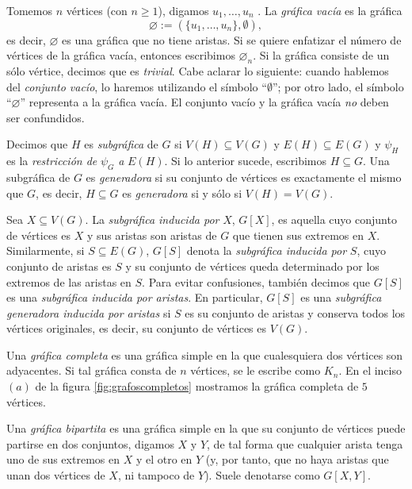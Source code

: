 Tomemos $n$ vértices (con $n\geq 1$), digamos $u_{1}, \ldots, u_{n}$ . La \textit{gráfica vacía} es la gráfica $$\varnothing := (\{u_{1}, \ldots, u_{n}\}, \emptyset),$$ es decir, $\varnothing$ es una gráfica que no tiene aristas. Si se quiere enfatizar el número de vértices de la gráfica vacía, entonces escribimos $\varnothing_{n}$. Si la gráfica consiste de un sólo vértice, decimos que es \textit{trivial}. Cabe aclarar lo siguiente: cuando hablemos del \textit{conjunto vacío}, lo haremos utilizando el símbolo ``$\emptyset$''; por otro lado, el símbolo ``$\varnothing$'' representa a la gráfica vacía. El conjunto vacío y la gráfica vacía \textit{no} deben ser confundidos. 

Decimos que $H$ es \textit{subgráfica}  de $G$ si $V(H) \subseteq V(G)$ y $E(H) \subseteq E(G)$ y $\psi_{H}$ es la \textit{restricción de} $\psi_{G}$ \textit{a} $E(H)$. Si lo anterior sucede, escribimos $H \subseteq G$. Una subgráfica de $G$ es \textit{generadora}  si su conjunto de vértices es exactamente el mismo que $G$, es decir, $H \subseteq G$ es \textit{generadora} si y sólo si $V(H)=V(G)$.

Sea $X \subseteq V(G)$. La \textit{subgráfica inducida por}  $X$, $G[X]$, es aquella cuyo conjunto de vértices es $X$ y sus aristas son aristas de $G$ que tienen sus extremos en $X$. Similarmente, si $S\subseteq E(G)$, $G[S]$ denota la \textit{subgráfica inducida por} $S$, cuyo conjunto de aristas es $S$ y su conjunto de vértices queda determinado por los extremos de las aristas en $S$. Para evitar confusiones, también decimos que $G[S]$ es una \textit{subgráfica inducida por aristas}. En particular, $G[S]$ es una \textit{subgráfica generadora inducida por aristas} si $S$ es su conjunto de aristas y conserva todos los vértices originales, es decir, su conjunto de vértices es $V(G)$.

Una \textit{gráfica completa} es una gráfica simple en la que cualesquiera dos vértices son adyacentes. Si tal gráfica consta de $n$ vértices, se le escribe como $K_{n}$. En el inciso $(a)$ de la figura \ref{fig:grafoscompletos} mostramos la gráfica completa de $5$ vértices.

Una \textit{gráfica bipartita} es una gráfica simple en la que su conjunto de vértices puede partirse en dos conjuntos, digamos $X$ y $Y$, de tal forma que cualquier arista tenga uno de sus extremos en $X$ y el otro en $Y$ (y, por tanto, que no haya aristas que unan dos vértices de $X$, ni tampoco de $Y$). Suele denotarse como $G[X,Y]$. 


